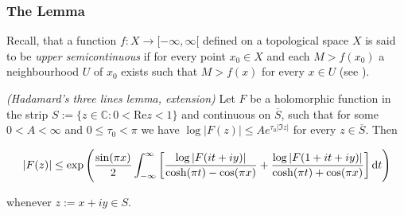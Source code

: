 \subsubsection{The Lemma}
Recall, that a function $f: X \to [-\infty,\infty[$ defined on a topological space $X$ is said to be \emph{upper semicontinuous} if for every point $x_0 \in X$ and each $M > f\left( x_0 \right)$ a neighbourhood $U$ of $x_0$ exists such that $M > f\left( x \right)$ for every $x \in U$ (see \cite[199]{rao:complex_analysis:1991}).

\vspace{2mm}

\begin{mdframed}
	\begin{lemma}\emph{(Hadamard's three lines lemma, extension)}
		Let $F$ be a holomorphic function in the strip $S := \{z \in \mathbb{C}: 0 < \mathrm{Re}z < 1\}$ and continuous on $\overline{S}$, such that for some $0 < A < \infty$ and $0 \leq \tau_0 < \pi$ we have $\log \vert F\left( z \right)\vert \leq A e^{\tau_0 \vert \Im z \vert}$ for every $z \in \overline{S}$. Then

			\begin{equation*}
				\vert F(z) \vert \leq \exp\left( \frac{\sin(\pi x)}{2} \int_{-\infty}^\infty \left[ \frac{\log \vert F(it + iy)\vert}{\cosh(\pi t) - \cos(\pi x)} + \frac{\log \vert F(1 + it + iy)\vert}{\cosh(\pi t) + \cos(\pi x)} \right] \mathop{}\!\mathrm{d} t\right)
			\end{equation*}

			whenever $z := x + iy \in S$.
			\label{lem:EHTL}
	\end{lemma}
\end{mdframed}

